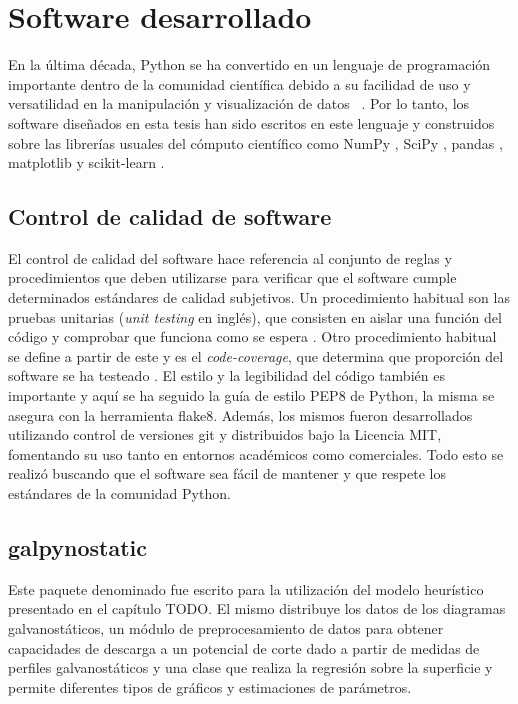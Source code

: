 \chapter{Software desarrollado}

En la última década, Python se ha convertido en un lenguaje de programación 
importante dentro de la comunidad científica debido a su facilidad de uso y 
versatilidad en la manipulación y visualización de datos ~\cite{millman2011}. 
Por lo tanto, los software diseñados en esta tesis han sido escritos en este
lenguaje y construidos sobre las librerías usuales del cómputo científico como
NumPy \cite{numpy}, SciPy \cite{scipy}, pandas \cite{pandas}, 
matplotlib \cite{matplotlib} y scikit-learn \cite{sklearn1, sklearn2}. 


\section{Control de calidad de software}

El control de calidad del software hace referencia al conjunto de reglas y 
procedimientos que deben utilizarse para verificar que el software cumple 
determinados estándares de calidad subjetivos. Un procedimiento habitual son las 
pruebas unitarias (\textit{unit testing} en inglés), que consisten en aislar una 
función del código y comprobar que funciona como se espera \cite{jazayeri2007}. 
Otro procedimiento habitual se define a partir de este y es el 
\textit{code-coverage}, que determina que proporción del software se ha testeado
\cite{miller1963}. El estilo y la legibilidad del código también es importante
y aquí se ha seguido la guía de estilo PEP8 de Python, la misma se asegura con 
la herramienta flake8. Además, los mismos fueron desarrollados utilizando control 
de versiones git y distribuidos bajo la Licencia MIT, fomentando su uso tanto en 
entornos académicos como comerciales. Todo esto se realizó buscando que el 
software sea fácil de mantener y que respete los estándares de la comunidad Python.


\section{galpynostatic}\label{software:galpynostatic}

Este paquete denominado  fue escrito para la utilización
del modelo heurístico presentado en el capítulo TODO. El mismo distribuye los 
datos de los diagramas galvanostáticos, un módulo de preprocesamiento de datos
para obtener capacidades de descarga a un potencial de corte dado a partir de 
medidas de perfiles galvanostáticos y una clase que realiza la regresión sobre la 
superficie y permite diferentes tipos de gráficos y estimaciones de parámetros.

